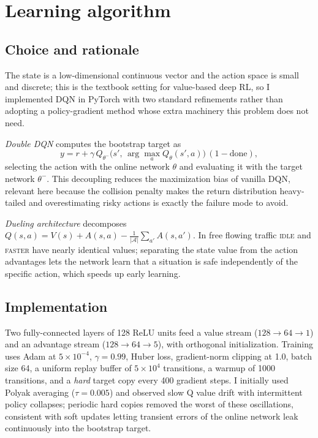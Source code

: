 \documentclass{article}
\begin{document}
\section{Learning algorithm}
\label{sec:algo}

\subsection{Choice and rationale}

The state is a low-dimensional continuous vector and the action space is small and discrete; this is the textbook setting for value-based deep RL, so I implemented DQN \cite{mnih2015} in PyTorch with two standard refinements rather than adopting a policy-gradient method whose extra machinery this problem does not need.

\emph{Double DQN} \cite{vanhasselt2016} computes the bootstrap target as
\begin{equation}
y = r + \gamma\, Q_{\theta^-}\!\bigl(s',\,\arg\max_a Q_\theta(s',a)\bigr)\,(1-\mathrm{done}),
\end{equation}
selecting the action with the online network $\theta$ and evaluating it with the target network $\theta^-$. This decoupling reduces the maximization bias of vanilla DQN, relevant here because the collision penalty makes the return distribution heavy-tailed and overestimating risky actions is exactly the failure mode to avoid.

\emph{Dueling architecture} \cite{wang2016} decomposes $Q(s,a)=V(s)+A(s,a)-\frac{1}{|\mathcal{A}|}\sum_{a'}A(s,a')$. In free flowing traffic \textsc{idle} and \textsc{faster} have nearly identical values; separating the state value from the action advantages lets the network learn that a situation is safe independently of the specific action, which speeds up early learning.

\subsection{Implementation}

Two fully-connected layers of 128 ReLU units feed a value stream ($128{\to}64{\to}1$) and an advantage stream ($128{\to}64{\to}5$), with orthogonal initialization. Training uses Adam at $5\times10^{-4}$, $\gamma{=}0.99$, Huber loss, gradient-norm clipping at 1.0, batch size 64, a uniform replay buffer of $5\times10^4$ transitions, a warmup of 1000 transitions, and a \emph{hard} target copy every 400 gradient steps. I initially used Polyak averaging ($\tau{=}0.005$) and observed slow Q value drift with intermittent policy collapses; periodic hard copies removed the worst of these oscillations, consistent with soft updates letting transient errors of the online network leak continuously into the bootstrap target.
\end{document}

